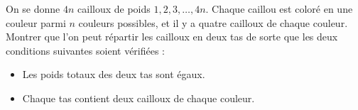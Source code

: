 On se donne $4n$ cailloux de poids $1, 2, 3, \ldots, 4n$. Chaque caillou est
coloré en une couleur parmi $n$ couleurs possibles, et il y a quatre cailloux
de chaque couleur. Montrer que l'on peut répartir les cailloux en deux tas de
sorte que les deux conditions suivantes soient vérifiées :
\begin{itemize}
  \item Les poids totaux des deux tas sont égaux.
  \item Chaque tas contient deux cailloux de chaque couleur.
\end{itemize}
